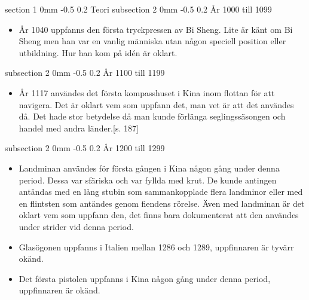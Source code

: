 \documentclass[a4paper,12pt]{article}
\makeatletter
\renewcommand{\section}{\@startsection
   {section}%
   {1}%
   {0mm}%
   {-0.5\baselineskip}%
   {0.2\baselineskip}%
   {\sffamily\bfseries\upshape\normalsize}}%
\renewcommand{\subsection}{\@startsection
   {subsection}%
   {2}%
   {0mm}%
   {-0.5\baselineskip}%
   {0.2\baselineskip}%
   {\rmfamily\normalfont\slshape\normalsize}}%
\makeatother
\begin{document}
\section{Teori}
\subsection{År 1000 till 1099}
\begin{itemize}
\item År 1040 uppfanns den första tryckpressen av Bi Sheng. Lite är känt om Bi Sheng men han var en vanlig människa utan någon speciell position eller utbildning. Hur han kom på idén är oklart.\cite{sheng}  
\end{itemize}

\subsection{År 1100 till 1199}
\begin{itemize}
\item År 1117 användes det första kompasshuset i Kina inom flottan för att navigera.\cite{compass} Det är oklart vem som uppfann det, man vet är att det användes då. Det hade stor betydelse då man kunde förlänga seglingssäsongen och handel med andra länder.\cite{hansson}[s. 187]
\end{itemize}

\subsection{År 1200 till 1299}
\begin{itemize}

\item Landminan användes för första gången i Kina någon gång under denna period.\cite{mina} Dessa var sfäriska och var fyllda med krut. De kunde antingen antändas med en lång stubin som sammankopplade flera landminor eller med en flintsten som antändes genom fiendens rörelse. Även med landminan är det oklart vem som uppfann den, det finns bara dokumenterat att den användes under strider vid denna period.

\item Glasögonen uppfanns i Italien mellan 1286 och 1289, uppfinnaren är tyvärr okänd.\cite{eyeglasses}

\item Det första pistolen uppfanns i Kina någon gång under denna period, uppfinnaren är okänd.\cite{handgun}

\end{itemize}
\end{document}
